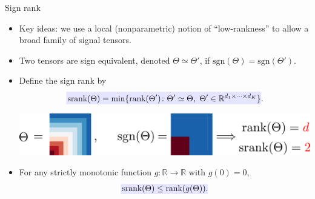 \documentclass[10pt, mathserif]{beamer} %
\theoremstyle{definition}
\theoremstyle{plain}
\begin{document}
\begin{frame}{Sign rank}
\begin{itemize}
    \item Key ideas: we use {\color{red}a local (nonparametric) notion of ``low-rankness''} to allow a broad family of signal tensors. 
        
    \item  Two tensors are sign equivalent, denoted $\Theta \simeq \Theta'$, if $\text{sgn}(\Theta) = \text{sgn}(\Theta')$.

    \item Define the {\color{red}sign rank} by
  \begin{align}
    \rlap{\textcolor{blue!10}{\rule[-\dp\strutbox]{235pt}{\baselineskip}}}\,\text{srank}(\Theta) = \min\{\text{rank}(\Theta')\colon \Theta'\simeq \Theta, \ \Theta'\in\mathbb{R}^{d_1\times\cdots\times d_K}\}.
\end{align}
    \pause
 \begin{center}
    \includegraphics[width =.9\textwidth]{Figures/signrank_new.pdf}
    \end{center}
\item For any strictly monotonic function $g\colon\mathbb{R}\rightarrow \mathbb{R}$ with $g(0) = 0$,
\[\rlap{\textcolor{blue!10}{\rule[-\dp\strutbox]{105pt}{\baselineskip}}}\,\text{srank}(\Theta)\leq \text{rank}(g(\Theta)).\]
\end{itemize}
\end{frame}
\end{document}
